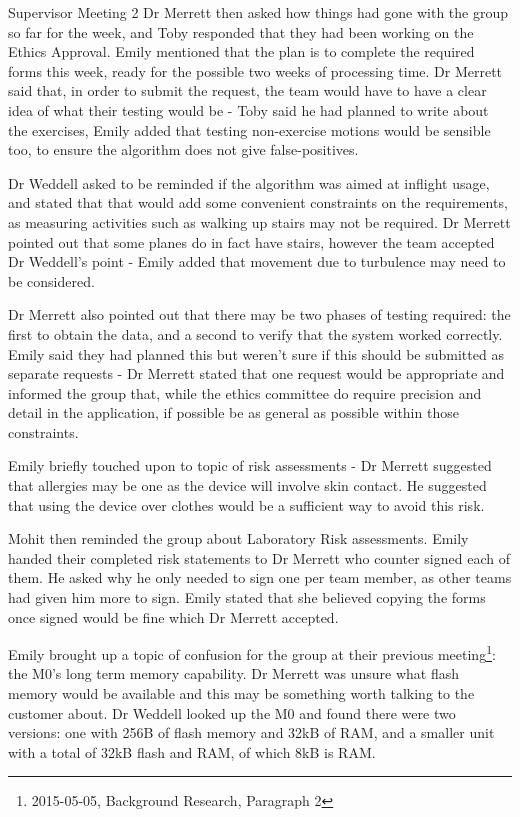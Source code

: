 \documentclass{article}
\begin{document}
\begin{Minutes}{Supervisor Meeting 2}
Dr Merrett then asked how things had gone with the group so far for the week, and Toby responded
that they had been working on the Ethics Approval. Emily mentioned that the plan is to complete
the required forms this week, ready for the possible two weeks of processing time. Dr Merrett
said that, in order to submit the request, the team would have to have a clear idea of what their
testing would be - Toby said he had planned to write about the exercises, Emily added that testing
non-exercise motions would be sensible too, to ensure the algorithm does not give false-positives.

Dr Weddell asked to be reminded if the algorithm was aimed at inflight usage, and stated that that
would add some convenient constraints on the requirements, as measuring activities such as walking
up stairs may not be required. Dr Merrett pointed out that some planes do in fact have stairs,
however the team accepted Dr Weddell's point - Emily added that movement due to turbulence may
need to be considered.

Dr Merrett also pointed out that there may be two phases of testing required: the first to obtain
the data, and a second to verify that the system worked correctly. Emily said they had planned this
but weren't sure if this should be submitted as separate requests - Dr Merrett stated that one
request would be appropriate and informed the group that, while the ethics committee do require
precision and detail in the application, if possible be as general as possible within those
constraints.

Emily briefly touched upon to topic of risk assessments - Dr Merrett suggested that allergies may
be one as the device will involve skin contact. He suggested that using the device over clothes
would be a sufficient way to avoid this risk.

Mohit then reminded the group about Laboratory Risk assessments. Emily handed their completed
risk statements to Dr Merrett who counter signed each of them. He asked why he only needed to sign
one per team member, as other teams had given him more to sign. Emily stated that she believed
copying the forms once signed would be fine which Dr Merrett accepted.


Emily brought up a topic of confusion for the group at their previous meeting\footnote
{2015-05-05, Background Research, Paragraph 2}: the M0's long term memory capability.
Dr Merrett was unsure what flash memory would be available and this may be something worth
talking to the customer about. Dr Weddell looked up the M0 and found there were two versions:
one with 256B of flash memory and 32kB of RAM, and a smaller unit with a total of 32kB flash
and RAM, of which 8kB is RAM.


\end{Minutes}
\end{document}
